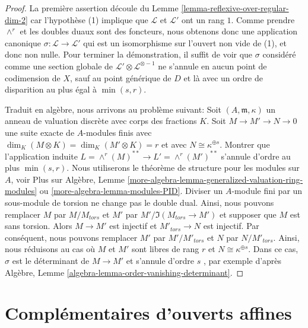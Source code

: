\begin{proof}
La première assertion découle du Lemme  \ref{lemma-reflexive-over-regular-dim-2}  car l'hypothèse (1) implique
que  $\mathcal{L}$  et  $\mathcal{L}'$  ont un rang  $1$. Comme prendre
 $\wedge^r$  et les doubles duaux sont des foncteurs, nous obtenons donc une
application canonique  $\sigma : \mathcal{L} \to \mathcal{L}'$  qui est un isomorphisme sur l'ouvert non vide
de (1), et donc non nulle. Pour terminer la démonstration, il suffit de voir que
 $\sigma$  considéré comme une section globale de  $\mathcal{L}' \otimes \mathcal{L}^{\otimes -1}$  ne s'annule en
aucun point de codimension de  $X$, sauf au point générique de
 $D$  et là avec un ordre de disparition au plus égal à  $\min(s, r)$.

\medskip\noindent
Traduit en algèbre, nous arrivons au problème suivant: Soit  $(A, \mathfrak m, \kappa)$  un anneau
de valuation discrète avec corps des fractions  $K$. Soit  $M \to M' \to N \to 0$  une
suite exacte de  $A$-modules finis avec  $\dim_K(M \otimes K) = \dim_K(M' \otimes K) = r$  et avec  $N \cong \kappa^{\oplus s}$.
Montrer que l'application induite  $L = \wedge^r(M)^{**} \to L' = \wedge^r(M')^{**}$  s'annule d'ordre au plus
 $\min(s, r)$. Nous utiliserons le théorème de structure pour les modules sur
 $A$, voir Plus sur Algèbre, Lemme  \ref{more-algebra-lemma-generalized-valuation-ring-modules}  ou  \ref{more-algebra-lemma-modules-PID}. Diviser
un  $A$-module fini par un sous-module de torsion ne change pas le double
dual. Ainsi, nous pouvons remplacer  $M$  par  $M/M_{tors}$  et  $M'$ 
par  $M'/\Im(M_{tors} \to M')$  et supposer que  $M$  est sans torsion. Alors  $M \to M'$ 
est injectif et  $M'_{tors} \to N$  est injectif. Par conséquent, nous pouvons remplacer
 $M'$  par  $M'/M'_{tors}$  et  $N$  par  $N/M'_{tors}$. Ainsi, nous
réduisons au cas où  $M$  et  $M'$  sont libres de rang  $r$ 
et  $N \cong \kappa^{\oplus s}$. Dans ce cas,  $\sigma$  est le déterminant de  $M \to M'$  et
s'annule d'ordre  $s$ , par exemple d'après Algèbre, Lemme  \ref{algebra-lemma-order-vanishing-determinant}.
\end{proof}









\section{Complémentaires d'ouverts affines}
\label{section-complement-affine-open}

